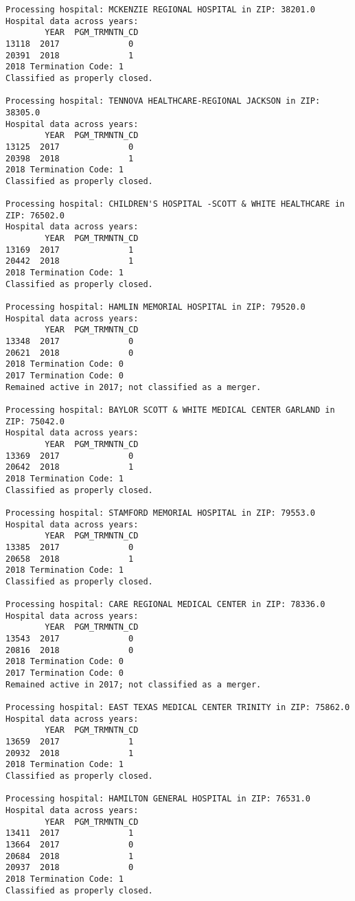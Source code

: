 \documentclass[
  letterpaper,
  DIV=11,
  numbers=noendperiod]{scrartcl}
\begin{document}
\begin{verbatim}
Processing hospital: MCKENZIE REGIONAL HOSPITAL in ZIP: 38201.0
Hospital data across years:
        YEAR  PGM_TRMNTN_CD
13118  2017              0
20391  2018              1
2018 Termination Code: 1
Classified as properly closed.

Processing hospital: TENNOVA HEALTHCARE-REGIONAL JACKSON in ZIP: 38305.0
Hospital data across years:
        YEAR  PGM_TRMNTN_CD
13125  2017              0
20398  2018              1
2018 Termination Code: 1
Classified as properly closed.

Processing hospital: CHILDREN'S HOSPITAL -SCOTT & WHITE HEALTHCARE in ZIP: 76502.0
Hospital data across years:
        YEAR  PGM_TRMNTN_CD
13169  2017              1
20442  2018              1
2018 Termination Code: 1
Classified as properly closed.

Processing hospital: HAMLIN MEMORIAL HOSPITAL in ZIP: 79520.0
Hospital data across years:
        YEAR  PGM_TRMNTN_CD
13348  2017              0
20621  2018              0
2018 Termination Code: 0
2017 Termination Code: 0
Remained active in 2017; not classified as a merger.

Processing hospital: BAYLOR SCOTT & WHITE MEDICAL CENTER GARLAND in ZIP: 75042.0
Hospital data across years:
        YEAR  PGM_TRMNTN_CD
13369  2017              0
20642  2018              1
2018 Termination Code: 1
Classified as properly closed.

Processing hospital: STAMFORD MEMORIAL HOSPITAL in ZIP: 79553.0
Hospital data across years:
        YEAR  PGM_TRMNTN_CD
13385  2017              0
20658  2018              1
2018 Termination Code: 1
Classified as properly closed.

Processing hospital: CARE REGIONAL MEDICAL CENTER in ZIP: 78336.0
Hospital data across years:
        YEAR  PGM_TRMNTN_CD
13543  2017              0
20816  2018              0
2018 Termination Code: 0
2017 Termination Code: 0
Remained active in 2017; not classified as a merger.

Processing hospital: EAST TEXAS MEDICAL CENTER TRINITY in ZIP: 75862.0
Hospital data across years:
        YEAR  PGM_TRMNTN_CD
13659  2017              1
20932  2018              1
2018 Termination Code: 1
Classified as properly closed.

Processing hospital: HAMILTON GENERAL HOSPITAL in ZIP: 76531.0
Hospital data across years:
        YEAR  PGM_TRMNTN_CD
13411  2017              1
13664  2017              0
20684  2018              1
20937  2018              0
2018 Termination Code: 1
Classified as properly closed.


\end{verbatim}
\end{document}
